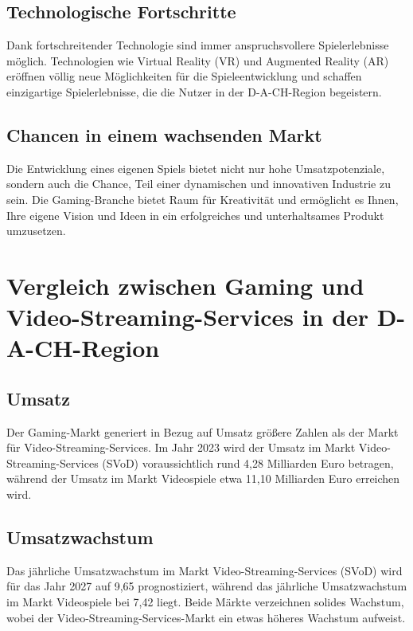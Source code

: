 \subsection{Technologische Fortschritte}
Dank fortschreitender Technologie sind immer anspruchsvollere Spielerlebnisse möglich. Technologien wie Virtual Reality (VR) und Augmented Reality (AR) eröffnen völlig neue Möglichkeiten für die Spieleentwicklung und schaffen einzigartige Spielerlebnisse, die die Nutzer in der D-A-CH-Region begeistern.

\subsection{Chancen in einem wachsenden Markt}
Die Entwicklung eines eigenen Spiels bietet nicht nur hohe Umsatzpotenziale, sondern auch die Chance, Teil einer dynamischen und innovativen Industrie zu sein. Die Gaming-Branche bietet Raum für Kreativität und ermöglicht es Ihnen, Ihre eigene Vision und Ideen in ein erfolgreiches und unterhaltsames Produkt umzusetzen.

\pagebreak

\section{Vergleich zwischen Gaming und Video-Streaming-Services in der D-A-CH-Region}

\subsection{Umsatz}

Der Gaming-Markt generiert in Bezug auf Umsatz größere Zahlen als der Markt für Video-Streaming-Services. Im Jahr 2023 wird der Umsatz im Markt Video-Streaming-Services (SVoD) voraussichtlich rund 4,28 Milliarden Euro betragen, während der Umsatz im Markt Videospiele etwa 11,10 Milliarden Euro erreichen wird.

\subsection{Umsatzwachstum}

Das jährliche Umsatzwachstum im Markt Video-Streaming-Services (SVoD) wird für das Jahr 2027 auf 9,65 prognostiziert, während das jährliche Umsatzwachstum im Markt Videospiele bei 7,42 liegt. Beide Märkte verzeichnen solides Wachstum, wobei der Video-Streaming-Services-Markt ein etwas höheres Wachstum aufweist.

